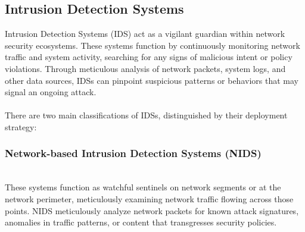 \documentclass[conference,letterpaper]{IEEEtran}
\begin{document}
\subsection{Intrusion Detection Systems}
Intrusion Detection Systems (IDS) act as a vigilant guardian within network security ecosystems.  These systems function by continuously monitoring network traffic and system activity, searching for any signs of malicious intent or policy violations. Through meticulous analysis of network packets, system logs, and other data sources, IDSs can pinpoint suspicious patterns or behaviors that may signal an ongoing attack.
~\\
~\\
There are two main classifications of IDSs, distinguished by their deployment strategy:
\\
\subsubsection{Network-based Intrusion Detection Systems (NIDS)}\\ These systems function as watchful sentinels on network segments or at the network perimeter, meticulously examining network traffic flowing across those points.  NIDS meticulously analyze network packets for known attack signatures, anomalies in traffic patterns, or content that transgresses security policies.
\end{document}
